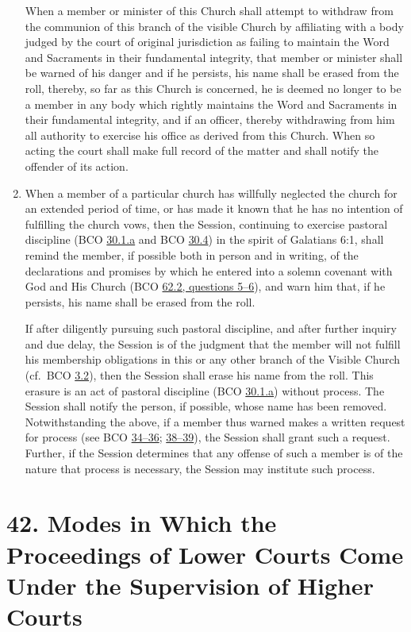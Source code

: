 \documentclass[
]{book}
\begin{document}
\begin{enumerate}
  When a member or minister of this Church shall attempt to withdraw from the communion of this branch of the visible Church by affiliating with a body judged by the court of original jurisdiction as failing to maintain the Word and Sacraments in their fundamental integrity, that member or minister shall be warned of his danger and if he persists, his name shall be erased from the roll, thereby, so far as this Church is concerned, he is deemed no longer to be a member in any body which rightly maintains the Word and Sacraments in their fundamental integrity, and if an officer, thereby withdrawing from him all authority to exercise his office as derived from this Church. When so acting the court shall make full record of the matter and shall notify the offender of its action.
\item
  \protect\hypertarget{41.4}{\href{}{}}When a member of a particular church has willfully neglected the church for an extended period of time, or has made it known that he has no intention of fulfilling the church vows, then the Session, continuing to exercise pastoral discipline (BCO \protect\hyperlink{30.1.a}{30.1.a} and BCO \protect\hyperlink{30.4}{30.4}) in the spirit of Galatians 6:1, shall remind the member, if possible both in person and in writing, of the declarations and promises by which he entered into a solemn covenant with God and His Church (BCO \protect\hyperlink{62.2.5}{62.2, questions 5--6}), and warn him that, if he persists, his name shall be erased from the roll.

  If after diligently pursuing such pastoral discipline, and after further inquiry and due delay, the Session is of the judgment that the member will not fulfill his membership obligations in this or any other branch of the Visible Church (cf.~BCO \protect\hyperlink{3.2}{3.2}), then the Session shall erase his name from the roll. This erasure is an act of pastoral discipline (BCO \protect\hyperlink{30.1.a}{30.1.a}) without process. The Session shall notify the person, if possible, whose name has been removed. Notwithstanding the above, if a member thus warned makes a written request for process (see BCO \protect\hyperlink{34}{34--36}; \protect\hyperlink{38}{38--39}), the Session shall grant such a request. Further, if the Session determines that any offense of such a member is of the nature that process is necessary, the Session may institute such process.
\end{enumerate}

\hypertarget{modes-in-which-the-proceedings-of-lower-courts-come-under-the-supervision-of-higher-courts}{%
\section*{42. Modes in Which the Proceedings of Lower Courts Come Under the Supervision of Higher Courts}\label{modes-in-which-the-proceedings-of-lower-courts-come-under-the-supervision-of-higher-courts}}
\end{document}
